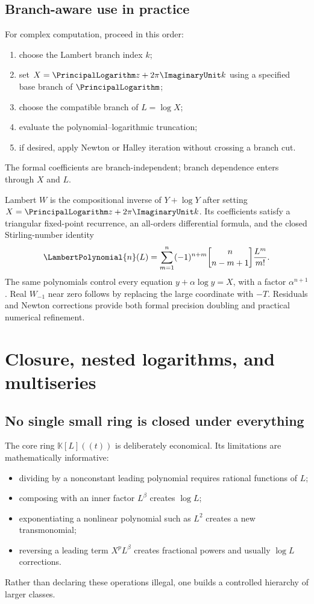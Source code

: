 \documentclass[11pt,openany]{book}
\theoremstyle{definition}
\theoremstyle{plain}
\theoremstyle{remark}
\newcommand{\K}{\mathbb{K}}
\newcommand{\stirlingone}[2]{\genfrac{[}{]}{0pt}{}{#1}{#2}}
\begin{document}
\section{Branch-aware use in practice}
For complex computation, proceed in this order:
\begin{enumerate}
\item choose the Lambert branch index \(k\);
\item set \(X=\PrincipalLogarithm z+2\pi\ImaginaryUnit k\) using a specified base branch of \(\PrincipalLogarithm\);
\item choose the compatible branch of \(L=\log X\);
\item evaluate the polynomial--logarithmic truncation;
\item if desired, apply Newton or Halley iteration without crossing a branch
      cut.
\end{enumerate}
The formal coefficients are branch-independent; branch dependence enters
through \(X\) and \(L\).

\begin{summarybox}
Lambert \(W\) is the compositional inverse of \(Y+\log Y\) after setting
\(X=\PrincipalLogarithm z+2\pi\ImaginaryUnit k\).  Its coefficients satisfy a triangular fixed-point
recurrence, an all-orders differential formula, and the closed Stirling-number
identity
\[
 \LambertPolynomial{n}(L)=\sum_{m=1}^n(-1)^{n+m}
 \stirlingone{n}{n-m+1}\frac{L^m}{m!}.
\]
The same polynomials control every equation \(y+\alpha\log y=X\), with a factor
\(\alpha^{n+1}\).  Real \(W_{-1}\) near zero follows by replacing the large
coordinate with \(-T\).  Residuals and Newton corrections provide both formal
precision doubling and practical numerical refinement.
\end{summarybox}

\chapter{Closure, nested logarithms, and multiseries}\label{ch:closure}

\section{No single small ring is closed under everything}
The core ring \(\K[L]((t))\) is deliberately economical.  Its limitations are
mathematically informative:
\begin{itemize}
\item dividing by a nonconstant leading polynomial requires rational functions
      of \(L\);
\item composing with an inner factor \(L^\beta\) creates \(\log L\);
\item exponentiating a nonlinear polynomial such as \(L^2\) creates a new
      transmonomial;
\item reversing a leading term \(X^pL^\beta\) creates fractional powers and
      usually \(\log L\) corrections.
\end{itemize}
Rather than declaring these operations illegal, one builds a controlled
hierarchy of larger classes.
\end{document}
